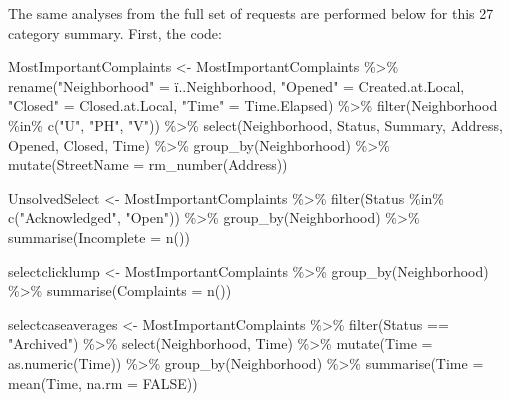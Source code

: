\documentclass[
]{article}
\newenvironment{Shaded}{\begin{snugshade}}{\end{snugshade}}
\newcommand{\AttributeTok}[1]{\textcolor[rgb]{0.77,0.63,0.00}{#1}}
\newcommand{\ConstantTok}[1]{\textcolor[rgb]{0.00,0.00,0.00}{#1}}
\newcommand{\FunctionTok}[1]{\textcolor[rgb]{0.00,0.00,0.00}{#1}}
\newcommand{\NormalTok}[1]{#1}
\newcommand{\OtherTok}[1]{\textcolor[rgb]{0.56,0.35,0.01}{#1}}
\newcommand{\SpecialCharTok}[1]{\textcolor[rgb]{0.00,0.00,0.00}{#1}}
\newcommand{\StringTok}[1]{\textcolor[rgb]{0.31,0.60,0.02}{#1}}
\begin{document}
The same analyses from the full set of requests are performed below for
this 27 category summary. First, the code:

\begin{Shaded}
\begin{Highlighting}[]
\NormalTok{MostImportantComplaints }\OtherTok{\textless{}{-}}\NormalTok{ MostImportantComplaints }\SpecialCharTok{\%\textgreater{}\%} 
\FunctionTok{rename}\NormalTok{(}\StringTok{"Neighborhood"} \OtherTok{=}\NormalTok{ ï..Neighborhood, }\StringTok{"Opened"} \OtherTok{=}\NormalTok{ Created.at.Local, }\StringTok{"Closed"} \OtherTok{=}\NormalTok{ Closed.at.Local, }\StringTok{"Time"} \OtherTok{=}\NormalTok{ Time.Elapsed) }\SpecialCharTok{\%\textgreater{}\%}
  \FunctionTok{filter}\NormalTok{(Neighborhood }\SpecialCharTok{\%in\%} \FunctionTok{c}\NormalTok{(}\StringTok{"U"}\NormalTok{, }\StringTok{"PH"}\NormalTok{, }\StringTok{"V"}\NormalTok{)) }\SpecialCharTok{\%\textgreater{}\%}
  \FunctionTok{select}\NormalTok{(Neighborhood, Status, Summary, Address, Opened, Closed, Time) }\SpecialCharTok{\%\textgreater{}\%}
  \FunctionTok{group\_by}\NormalTok{(Neighborhood) }\SpecialCharTok{\%\textgreater{}\%}
  \FunctionTok{mutate}\NormalTok{(}\AttributeTok{StreetName =} \FunctionTok{rm\_number}\NormalTok{(Address))}

 
\NormalTok{   UnsolvedSelect }\OtherTok{\textless{}{-}}\NormalTok{ MostImportantComplaints }\SpecialCharTok{\%\textgreater{}\%}
  \FunctionTok{filter}\NormalTok{(Status }\SpecialCharTok{\%in\%} \FunctionTok{c}\NormalTok{(}\StringTok{"Acknowledged"}\NormalTok{, }\StringTok{"Open"}\NormalTok{)) }\SpecialCharTok{\%\textgreater{}\%}
  \FunctionTok{group\_by}\NormalTok{(Neighborhood) }\SpecialCharTok{\%\textgreater{}\%}
  \FunctionTok{summarise}\NormalTok{(}\AttributeTok{Incomplete =} \FunctionTok{n}\NormalTok{())}
  
\NormalTok{selectclicklump }\OtherTok{\textless{}{-}}\NormalTok{ MostImportantComplaints }\SpecialCharTok{\%\textgreater{}\%}
  \FunctionTok{group\_by}\NormalTok{(Neighborhood) }\SpecialCharTok{\%\textgreater{}\%}
  \FunctionTok{summarise}\NormalTok{(}\AttributeTok{Complaints =} \FunctionTok{n}\NormalTok{())}

\NormalTok{selectcaseaverages }\OtherTok{\textless{}{-}}\NormalTok{ MostImportantComplaints }\SpecialCharTok{\%\textgreater{}\%}
  \FunctionTok{filter}\NormalTok{(Status }\SpecialCharTok{==} \StringTok{"Archived"}\NormalTok{) }\SpecialCharTok{\%\textgreater{}\%}
  \FunctionTok{select}\NormalTok{(Neighborhood, Time) }\SpecialCharTok{\%\textgreater{}\%}
  \FunctionTok{mutate}\NormalTok{(}\AttributeTok{Time =} \FunctionTok{as.numeric}\NormalTok{(Time)) }\SpecialCharTok{\%\textgreater{}\%}
  \FunctionTok{group\_by}\NormalTok{(Neighborhood) }\SpecialCharTok{\%\textgreater{}\%}
  \FunctionTok{summarise}\NormalTok{(}\AttributeTok{Time =} \FunctionTok{mean}\NormalTok{(Time, }\AttributeTok{na.rm =} \ConstantTok{FALSE}\NormalTok{))}
 


\end{Highlighting}
\end{Shaded}
\end{document}
